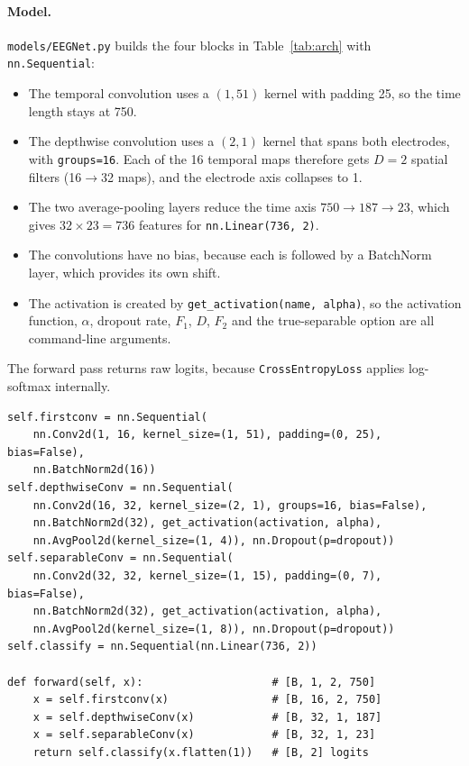 \documentclass[11pt,a4paper]{article}
\begin{document}
\paragraph{Model.} \texttt{models/EEGNet.py} builds the four blocks in Table~\ref{tab:arch} with \texttt{nn.Sequential}:
\begin{itemize}
  \item The temporal convolution uses a $(1,51)$ kernel with padding 25, so the time length stays at 750.
  \item The depthwise convolution uses a $(2,1)$ kernel that spans both electrodes, with \texttt{groups=16}. Each of the 16 temporal maps therefore gets $D=2$ spatial filters (16$\to$32 maps), and the electrode axis collapses to 1.
  \item The two average-pooling layers reduce the time axis $750\to187\to23$, which gives $32\times23=736$ features for \texttt{nn.Linear(736, 2)}.
  \item The convolutions have no bias, because each is followed by a BatchNorm layer, which provides its own shift.
  \item The activation is created by \texttt{get\_activation(name, alpha)}, so the activation function, $\alpha$, dropout rate, $F_1$, $D$, $F_2$ and the true-separable option are all command-line arguments.
\end{itemize}
The forward pass returns raw logits, because \texttt{CrossEntropyLoss} applies log-softmax internally.
\begin{lstlisting}
self.firstconv = nn.Sequential(
    nn.Conv2d(1, 16, kernel_size=(1, 51), padding=(0, 25), bias=False),
    nn.BatchNorm2d(16))
self.depthwiseConv = nn.Sequential(
    nn.Conv2d(16, 32, kernel_size=(2, 1), groups=16, bias=False),
    nn.BatchNorm2d(32), get_activation(activation, alpha),
    nn.AvgPool2d(kernel_size=(1, 4)), nn.Dropout(p=dropout))
self.separableConv = nn.Sequential(
    nn.Conv2d(32, 32, kernel_size=(1, 15), padding=(0, 7), bias=False),
    nn.BatchNorm2d(32), get_activation(activation, alpha),
    nn.AvgPool2d(kernel_size=(1, 8)), nn.Dropout(p=dropout))
self.classify = nn.Sequential(nn.Linear(736, 2))

def forward(self, x):                    # [B, 1, 2, 750]
    x = self.firstconv(x)                # [B, 16, 2, 750]
    x = self.depthwiseConv(x)            # [B, 32, 1, 187]
    x = self.separableConv(x)            # [B, 32, 1, 23]
    return self.classify(x.flatten(1))   # [B, 2] logits
\end{lstlisting}
\end{document}
